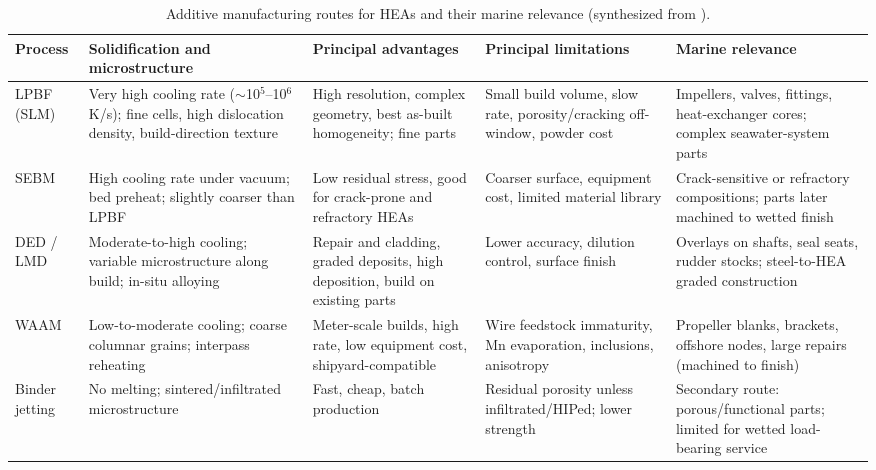 \begin{table}[t]
\centering
\caption{Additive manufacturing routes for HEAs and their marine relevance (synthesized from \cite{cagirici2024,han2025,raultaiwade2021,abdullah2024rhea}).}
\label{tab:am_processes}
\footnotesize
\begin{tabularx}{\textwidth}{@{}lXXXX@{}}
\toprule
Process & Solidification and microstructure & Principal advantages & Principal limitations & Marine relevance \\
\midrule
LPBF (SLM) & Very high cooling rate ($\sim$10$^{5}$--10$^{6}$ K/s); fine cells, high dislocation density, build-direction texture & High resolution, complex geometry, best as-built homogeneity; fine parts & Small build volume, slow rate, porosity/cracking off-window, powder cost & Impellers, valves, fittings, heat-exchanger cores; complex seawater-system parts \\
SEBM & High cooling rate under vacuum; bed preheat; slightly coarser than LPBF & Low residual stress, good for crack-prone and refractory HEAs & Coarser surface, equipment cost, limited material library & Crack-sensitive or refractory compositions; parts later machined to wetted finish \\
DED / LMD & Moderate-to-high cooling; variable microstructure along build; in-situ alloying & Repair and cladding, graded deposits, high deposition, build on existing parts & Lower accuracy, dilution control, surface finish & Overlays on shafts, seal seats, rudder stocks; steel-to-HEA graded construction \\
WAAM & Low-to-moderate cooling; coarse columnar grains; interpass reheating & Meter-scale builds, high rate, low equipment cost, shipyard-compatible & Wire feedstock immaturity, Mn evaporation, inclusions, anisotropy & Propeller blanks, brackets, offshore nodes, large repairs (machined to finish) \\
Binder jetting & No melting; sintered/infiltrated microstructure & Fast, cheap, batch production & Residual porosity unless infiltrated/HIPed; lower strength & Secondary route: porous/functional parts; limited for wetted load-bearing service \\
\bottomrule
\end{tabularx}
\end{table}
